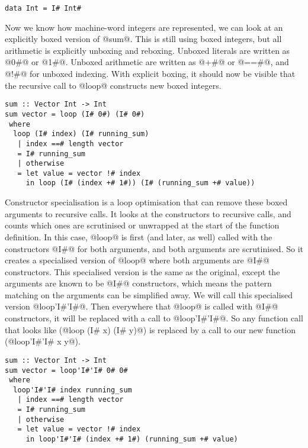 \begin{lstlisting}
data Int = I# Int#
\end{lstlisting}

Now we know how machine-word integers are represented, we can look at an explicitly boxed version of @sum@.
This is still using boxed integers, but all arithmetic is explicitly unboxing and reboxing.
Unboxed literals are written as @0#@ or @1#@.
Unboxed arithmetic are written as @+#@ or @==#@, and @!#@ for unboxed indexing.
With explicit boxing, it should now be visible that the recursive call to @loop@ constructs new boxed integers.

\begin{lstlisting}
sum :: Vector Int -> Int
sum vector = loop (I# 0#) (I# 0#)
 where
  loop (I# index) (I# running_sum)
   | index ==# length vector
   = I# running_sum
   | otherwise
   = let value = vector !# index
     in loop (I# (index +# 1#)) (I# (running_sum +# value))
\end{lstlisting}

Constructor specialisation \cite{peyton2007call} is a loop optimisation that can remove these boxed arguments to recursive calls.
It looks at the constructors to recursive calls, and counts which ones are scrutinised or unwrapped at the start of the function definition.
In this case, @loop@ is first (and later, as well) called with the constructors @I#@ for both arguments, and both arguments are scrutinised.
So it creates a specialised version of @loop@ where both arguments are @I#@ constructors.
This specialised version is the same as the original, except the arguments are known to be @I#@ constructors, which means the pattern matching on the arguments can be simplified away.
We will call this specialised version @loop'I#'I#@.
Then everywhere that @loop@ is called with @I#@ constructors, it will be replaced with a call to @loop'I#'I#@.
So any function call that looks like (@loop (I# x) (I# y)@) is replaced by a call to our new function (@loop'I#'I# x y@).

\begin{lstlisting}
sum :: Vector Int -> Int
sum vector = loop'I#'I# 0# 0#
 where
  loop'I#'I# index running_sum
   | index ==# length vector
   = I# running_sum
   | otherwise
   = let value = vector !# index
     in loop'I#'I# (index +# 1#) (running_sum +# value)
\end{lstlisting}

